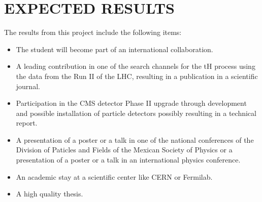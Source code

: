\documentclass[final,3p]{CSP}
\begin{document}
\section{EXPECTED RESULTS}

\onehalfspacing The results from this project include the following items:
\begin{itemize}
\item The student will become part of an international collaboration.
\item A leading contribution in one of the search channels for the tH process using the data from the Run II of the LHC, resulting in a publication in a scientific journal.
\item Participation in the CMS detector Phase II upgrade through development and possible installation of particle detectors possibly resulting in a technical report.
\item A presentation of a poster or a talk in one of the national conferences of the Division of Paticles and Fields of the Mexican Society of Physics or a presentation of a poster or a talk in an international physics conference.
\item An academic stay at a scientific center like CERN or Fermilab.
\item A high quality thesis.
\end{itemize}
\end{document}
